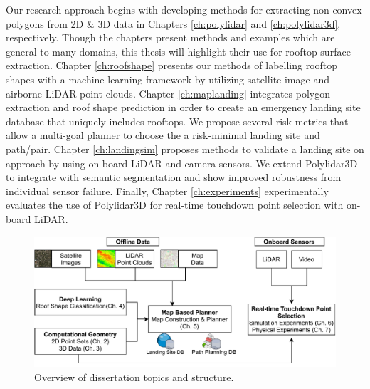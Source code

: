 Our research approach begins with developing methods for extracting non-convex polygons from 2D \& 3D data in Chapters \ref{ch:polylidar} and \ref{ch:polylidar3d}, respectively. Though the chapters present methods and examples which are general to many domains, this thesis will highlight their use for rooftop surface extraction. Chapter \ref{ch:roofshape} presents our methods of labelling rooftop shapes with a machine learning framework by utilizing satellite image and airborne LiDAR point clouds.  Chapter \ref{ch:maplanding} integrates polygon extraction and roof shape prediction in order to create an emergency landing site database that uniquely includes rooftops. We propose several risk metrics that allow a multi-goal planner to choose the a risk-minimal landing site and path/pair. Chapter \ref{ch:landingsim} proposes methods to validate a landing site on approach by using on-board LiDAR and camera sensors. We extend Polylidar3D to integrate with semantic segmentation and show improved robustness from individual sensor failure. Finally, Chapter \ref{ch:experiments} experimentally evaluates the use of Polylidar3D for real-time touchdown point selection with on-board LiDAR.

\begin{figure}[t]
    \centering
    \includegraphics[width=0.80\linewidth]{chapter_1_intro/imgs/Challenge_Overview-thesis_overview.pdf}
    \caption{Overview of dissertation topics and structure.}
    \label{fig:ch1_thesis_overview}
\end{figure}




